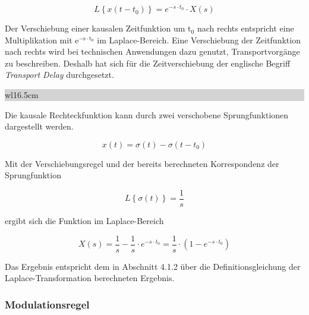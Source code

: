\begin{equation}\label{eq:fourthirtyseven}
L\left\{x\left(t-t_{0} \right)\right\}=e^{-s\cdot t_{0} } \cdot X\left(s\right)
\end{equation}

\noindent Der Verschiebung einer kausalen Zeitfunktion um t$_{0}$ nach rechts entspricht eine Multiplikation mit e$^{{\mathrm{-s}\cdot\mathrm{t}}_0}$ im Laplace-Bereich. Eine Verschiebung der Zeitfunktion nach rechts wird bei technischen Anwendungen dazu genutzt, Transportvorg\"{a}nge zu beschreiben. Deshalb hat sich f\"{u}r die Zeitverschiebung der englische Begriff \textit{Transport Delay} durchgesetzt. \bigskip

\noindent
\colorbox{lightgray}{%
%
\renewcommand\arraystretch{0.6}%
\begin{tabular}{ wl{16.5cm} }
{\selectfont{Beispiel: Verschiebungsregel der Laplace-Transformation}}
\end{tabular}%
}\bigskip

\noindent Die kausale Rechteckfunktion kann durch zwei verschobene Sprungfunktionen dargestellt werden.

\begin{equation}\label{eq:fourthirtyeight}
x\left(t\right)=\sigma \left(t\right)-\sigma \left(t-t_{0} \right)
\end{equation}

\noindent Mit der Verschiebungsregel und der bereits berechneten Korrespondenz der Sprungfunktion

\begin{equation}\label{eq:fourthirtynine}
L\left\{\sigma \left(t\right)\right\}=\frac{1}{s} 
\end{equation}

\noindent ergibt sich die Funktion im Laplace-Bereich

\begin{equation}\label{eq:fourfourty}
X\left(s\right)=\frac{1}{s} -\frac{1}{s} \cdot e^{-s\cdot t_{0} } =\frac{1}{s} \cdot \left(1-e^{-s\cdot t_{0} } \right)
\end{equation}

\noindent Das Ergebnis entspricht dem in Abschnitt 4.1.2 \"{u}ber die Definitionsgleichung der Laplace-Transformation berechneten Ergebnis.

\clearpage

\subsubsection{Modulationsregel}

